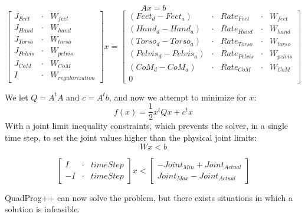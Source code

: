 \documentclass{article}
\begin{document}
\begin{equation} 
Ax = b 
\end{equation}
\begin{equation} 
\begin{bmatrix}
J_{Feet} &\cdot & W_{feet} \\
J_{Hand} &\cdot & W_{hand} \\
J_{Torso} &\cdot & W_{torso} \\
J_{Pelvis} &\cdot & W_{pelvis} \\
J_{CoM} &\cdot & W_{CoM} \\
I &\cdot & W_{regularization}
\end{bmatrix}
x = 
\begin{bmatrix}
(Feet_d - Feet_a) &\cdot & {Rate}_{Feet} &\cdot & W_{feet} \\
(Hand_d - Hand_a) &\cdot & {Rate}_{Hand} &\cdot & W_{hand} \\
(Torso_d - Torso_a) &\cdot & {Rate}_{Torso} &\cdot & W_{torso} \\
(Pelvis_d - Pelvis_a) &\cdot & {Rate}_{Pelvis} &\cdot & W_{pelvis} \\
(CoM_d - CoM_a) &\cdot & {Rate}_{CoM} &\cdot & W_{CoM} \\
0
\end{bmatrix}
\end{equation}

We let $Q=A^tA$ and $c=A^tb$, and now we attempt to minimize for $x$:  
\begin{equation} 
f(x) = \frac{1}{2}x^tQx + c^tx 
\end{equation}
With a joint limit inequality constraints, which prevents the solver, in a single time step, to set the joint values higher than the physical joint limits:
\begin{equation} 
Wx<b
\end{equation}

\begin{equation} 
\begin{bmatrix}
I &\cdot & timeStep \\
-I &\cdot & timeStep 
\end{bmatrix}
x
< 
\begin{bmatrix}
-Joint_{Min} + {Joint}_{Actual} \\
Joint_{Max} - {Joint}_{Actual}
\end{bmatrix}
\end{equation}

QuadProg++ can now solve the problem, but there exists situations in which a solution is infeasible. 
\end{document}

